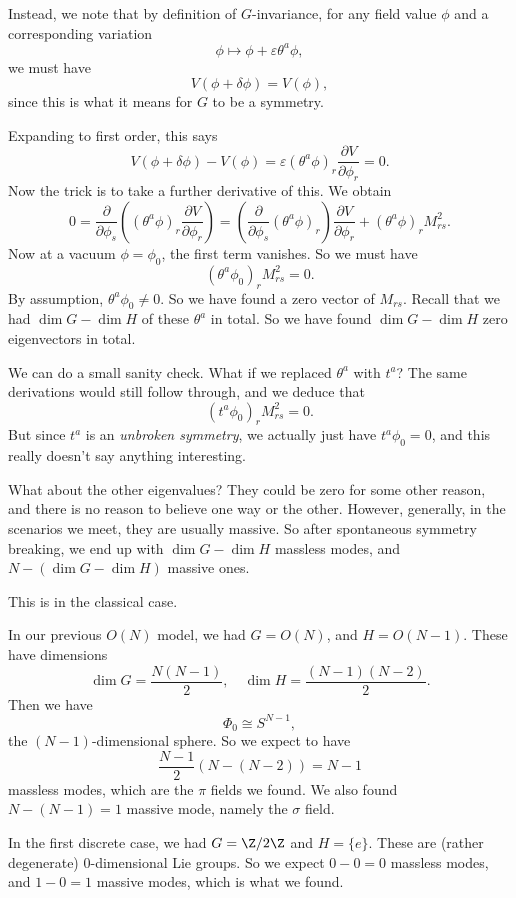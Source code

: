 \documentclass[a4paper]{article}
\begin{document}
Instead, we note that by definition of $G$-invariance, for any field value $\phi$ and a corresponding variation
\[
  \phi \mapsto \phi + \varepsilon \theta^a \phi,
\]
we must have
\[
  V(\phi + \delta \phi) = V(\phi),
\]
since this is what it means for $G$ to be a symmetry.

Expanding to first order, this says
\[
  V(\phi + \delta \phi) - V(\phi) = \varepsilon (\theta^a \phi)_r \frac{\partial V}{\partial \phi_r} = 0.
\]
Now the trick is to take a further derivative of this. We obtain
\[
  0 = \frac{\partial}{\partial \phi_s} \left((\theta^a \phi)_r \frac{\partial V}{\partial \phi_r}\right) = \left(\frac{\partial}{\partial \phi_s} (\theta^a \phi)_r\right) \frac{\partial V}{\partial \phi_r} + (\theta^a \phi)_r M_{rs}^2.
\]
Now at a vacuum $\phi = \phi_0$, the first term vanishes. So we must have
\[
  (\theta^a \phi_0)_r M_{rs}^2 = 0.
\]
By assumption, $\theta^a \phi_0 \not= 0$. So we have found a zero vector of $M_{rs}$. Recall that we had $\dim G - \dim H$ of these $\theta^a$ in total. So we have found $\dim G - \dim H$ zero eigenvectors in total.

We can do a small sanity check. What if we replaced $\theta^a$ with $t^a$? The same derivations would still follow through, and we deduce that
\[
  (t^a \phi_0)_r M_{rs}^2 = 0.
\]
But since $t^a$ is an \emph{unbroken symmetry}, we actually just have $t^a \phi_0 = 0$, and this really doesn't say anything interesting.

What about the other eigenvalues? They could be zero for some other reason, and there is no reason to believe one way or the other. However, generally, in the scenarios we meet, they are usually massive. So after spontaneous symmetry breaking, we end up with $\dim G - \dim H$ massless modes, and $N - (\dim G - \dim H)$ massive ones.

This is  in the classical case.
\begin{eg}
  In our previous $O(N)$ model, we had $G = O(N)$, and $H = O(N - 1)$. These have dimensions
  \[
    \dim G = \frac{N(N - 1)}{2},\quad \dim H = \frac{(N - 1)(N - 2)}{2}.
  \]
  Then we have
  \[
    \Phi_0 \cong S^{N - 1},
  \]
  the $(N - 1)$-dimensional sphere. So we expect to have
  \[
    \frac{N - 1}{2} (N - (N - 2)) = N - 1
  \]
  massless modes, which are the $\pi$ fields we found. We also found $N - (N - 1) = 1$ massive mode, namely the $\sigma$ field.
\end{eg}

\begin{eg}
  In the first discrete case, we had $G = \Z/2\Z$ and $H = \{e\}$. These are (rather degenerate) $0$-dimensional Lie groups. So we expect $0 - 0 = 0$ massless modes, and $1 - 0 = 1$ massive modes, which is what we found.
\end{eg}
\end{document}
